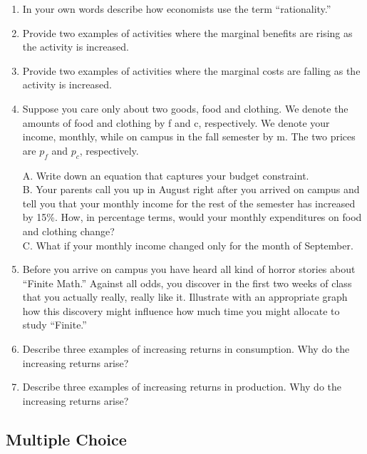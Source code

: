 \documentclass[
]{book}
\begin{document}
\begin{enumerate}
\def\labelenumi{\arabic{enumi}.}
\item
  In your own words describe how economists use the term ``rationality.''
\item
  Provide two examples of activities where the marginal benefits are rising as the activity is increased.
\item
  Provide two examples of activities where the marginal costs are falling as the activity is increased.
\item
  Suppose you care only about two goods, food and clothing. We denote the amounts of food and clothing by f and c, respectively. We denote your income, monthly, while on campus in the fall semester by m. The two prices are \(p_f\) and \(p_c\), respectively.

  A. Write down an equation that captures your budget constraint.\\
  B. Your parents call you up in August right after you arrived on campus and tell you that your monthly income for the rest of the semester has increased by 15\%. How, in percentage terms, would your monthly expenditures on food and clothing change?\\
  C. What if your monthly income changed only for the month of September.
\item
  Before you arrive on campus you have heard all kind of horror stories about ``Finite Math.'' Against all odds, you discover in the first two weeks of class that you actually really, really like it. Illustrate with an appropriate graph how this discovery might influence how much time you might allocate to study ``Finite.''
\item
  Describe three examples of increasing returns in consumption. Why do the increasing returns arise?
\item
  Describe three examples of increasing returns in production. Why do the increasing returns arise?
\end{enumerate}

\hypertarget{multiple-choice-2}{%
\subsection{Multiple Choice}\label{multiple-choice-2}}
\end{document}
